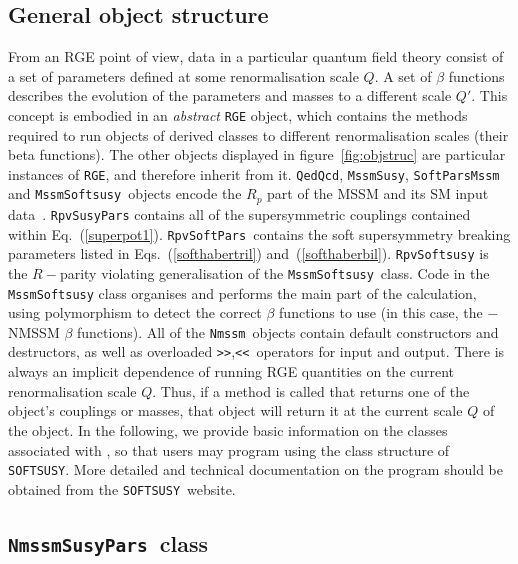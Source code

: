 \documentclass[final,3p,times,pdflatex]{elsarticle}
\def\SOFTSUSY{{\tt SOFTSUSY}}
\def\code#1{\small{\tt #1}\normalsize}
\begin{document}
\subsection{General object structure}

From an RGE point of view, data in a particular quantum field theory 
consist of a set of parameters defined at some
renormalisation scale $Q$. 
A set of $\beta$ functions describes the
evolution of the parameters and masses to a different scale
$Q'$. This concept is embodied in an {\em abstract} \code{RGE}
object, which contains the methods required to run objects of derived
classes to different renormalisation scales (their beta functions). The other
objects 
displayed in figure~\ref{fig:objstruc} are particular instances of
\code{RGE}, and therefore inherit from it. \code{QedQcd}, \code{MssmSusy},
\code{SoftParsMssm} and \code{MssmSoftsusy}~objects encode the $R_p$ part of the
MSSM and its SM input data~\cite{Allanach:2001kg}.
\code{RpvSusyPars} contains all of the supersymmetric  couplings contained
within  Eq.~(\ref{superpot1}). 
\code{RpvSoftPars}~contains the  soft supersymmetry breaking parameters
listed in 
Eqs.~(\ref{softhabertril}) and~(\ref{softhaberbil}). \code{RpvSoftsusy} is
the  $R-$parity violating
generalisation of the \code{MssmSoftsusy}~class. 
Code in
the \code{MssmSoftsusy} class organises and performs the main part of
the calculation, using polymorphism to detect the correct $\beta$ functions to
use (in this case, the $-$NMSSM $\beta$ functions). 
All of the \code{Nmssm}~objects contain default constructors
and destructors, as well as overloaded \code{>>},\code{<<}~operators for input
and output. 
There is always an implicit dependence of running RGE quantities on the
current renormalisation scale $Q$. Thus, if a method is called that returns
one of the object's couplings or masses, that object will return it at the
current scale $Q$ of the object. 
In the following, we provide basic information on the 
classes associated with , so that users may program using the class
structure of \SOFTSUSY\@. More detailed and
technical documentation on the program should be obtained from the
\SOFTSUSY~website. 


\subsection{\code{NmssmSusyPars}~class}

\begin{thebibliography}{10}
\end{thebibliography}
\end{document}
